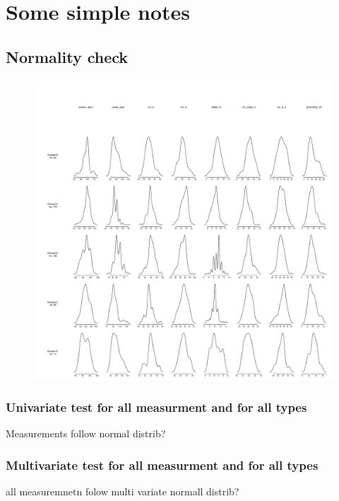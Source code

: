\documentclass{article}
\begin{document}
\section{ Some simple notes}

\subsection{ Normality check}
\begin{figure}[h]
    \includegraphics[width=\textwidth]{distrib_allmeasurment_dresseltype.pdf}
\end{figure}

\subsubsection{Univariate test for all measurment and for all types}
Measurements follow normal distrib?


\subsubsection{Multivariate test for all measurment and for all types}
all measuremnetn folow multi variate normall distrib?

\end{document}
